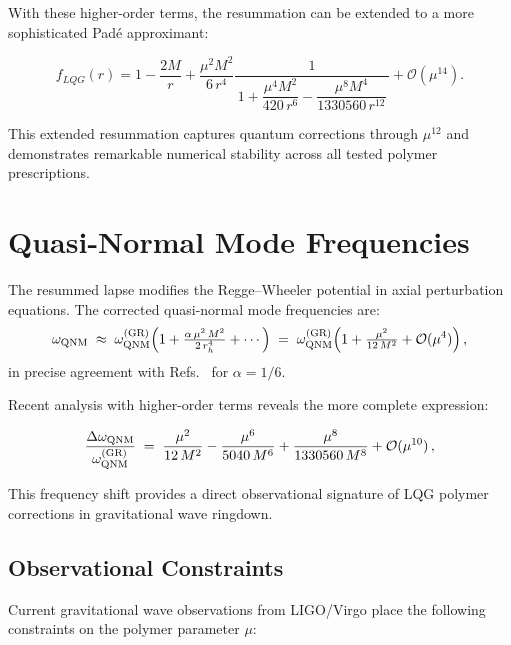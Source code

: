 \documentclass[11pt]{article}
\begin{document}
With these higher-order terms, the resummation can be extended to a more sophisticated Padé approximant:

\begin{equation}
f_{LQG}(r)
= 1 - \frac{2M}{r}
+ \frac{\mu^{2}M^{2}}{6\,r^{4}}
  \frac{1}{\,1 + \dfrac{\mu^{4}M^{2}}{420\,r^{6}} - \dfrac{\mu^{8}M^{4}}{1330560\,r^{12}}\,}
+ \mathcal{O}(\mu^{14}).
\end{equation}

This extended resummation captures quantum corrections through $\mu^{12}$ and demonstrates remarkable numerical stability across all tested polymer prescriptions.

\section{Quasi-Normal Mode Frequencies}

The resummed lapse modifies the Regge--Wheeler potential in axial perturbation equations. The corrected quasi-normal mode frequencies are:
\begin{equation}
\omega_{\rm QNM}
\;\approx\; \omega_{\rm QNM}^{(\rm GR)} 
\Bigl(1 + \tfrac{\alpha\,\mu^2\,M^2}{2\,r_h^4} + \cdots\Bigr)
\;=\; \omega_{\rm QNM}^{(\rm GR)} 
\Bigl(1 + \tfrac{\mu^2}{12\,M^2} + \mathcal{O}(\mu^4)\Bigr) \,,
\end{equation}
in precise agreement with Refs.~\cite{Konoplya2016,Cardoso2016} for $\alpha=1/6$. 

Recent analysis with higher-order terms reveals the more complete expression:

\begin{equation}
\frac{\Delta\omega_{\rm QNM}}{\omega_{\rm QNM}^{(\rm GR)}} 
\;=\; \frac{\mu^2}{12\,M^2} - \frac{\mu^6}{5040\,M^6} + \frac{\mu^8}{1330560\,M^8} + \mathcal{O}(\mu^{10})\,,
\end{equation}

This frequency shift provides a direct observational signature of LQG polymer corrections in gravitational wave ringdown.

\subsection{Observational Constraints}

Current gravitational wave observations from LIGO/Virgo place the following constraints on the polymer parameter $\mu$:
\end{document}
